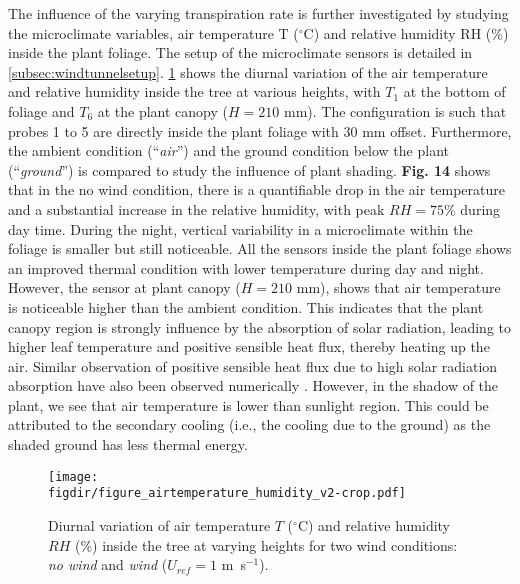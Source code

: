 The influence of the varying transpiration rate is further investigated by studying the microclimate variables, air temperature T ($^{\circ}$C) and relative humidity RH (\%) inside the plant foliage. The setup of the microclimate sensors is detailed in \cref{subsec:windtunnelsetup}. \cref{fig:figure_airtemperature_humidity_v2} shows the diurnal variation of the air temperature and relative humidity inside the tree at various heights, with $T_1$ at the bottom of foliage and $T_6$ at the plant canopy ($H=210$ mm). The configuration is such that probes 1 to 5 are directly inside the plant foliage with $30$ mm offset. Furthermore, the ambient condition (``\textit{air}'') and the ground condition below the plant (``\textit{ground}'') is compared to study the influence of plant shading. \textbf{Fig. 14} shows that in the no wind condition, there is a quantifiable drop in the air temperature and a substantial increase in the relative humidity, with peak $RH=75$\% during day time. During the night, vertical variability in a microclimate within the foliage is smaller but still noticeable. All the sensors inside the plant foliage shows an improved thermal condition with lower temperature during day and night. However, the sensor at plant canopy ($H=210$ mm), shows that air temperature is noticeable higher than the ambient condition. This indicates that the plant canopy region is strongly influence by the absorption of solar radiation, leading to higher leaf temperature and positive sensible heat flux, thereby heating up the air. Similar observation of positive sensible heat flux due to high solar radiation absorption have also been observed numerically \citep{Manickathan2018a}. However, in the shadow of the plant, we see that air temperature is lower than sunlight region. This could be attributed to the secondary cooling (i.e., the cooling due to the ground) as the shaded ground has less thermal energy. 

	\begin{figure}[t]
	\centering
	\texttt{[image: \\figdir/figure\_airtemperature\_humidity\_v2-crop.pdf]}
	\caption{Diurnal variation of air temperature $T$ ($^{\circ}$C) and relative humidity $RH$ (\%) inside the tree at varying heights for two wind conditions:  \textit{no wind} and  \textit{wind} ($U_{ref}=1$ m~s$^{-1}$).}
	\label{fig:figure_airtemperature_humidity_v2}
	\end{figure}

